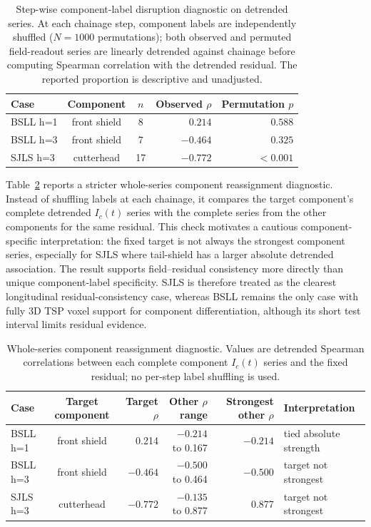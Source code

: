 \begin{table}[htbp]
\centering
\caption{Step-wise component-label disruption diagnostic on detrended series.
At each chainage step, component labels are independently shuffled ($N=1000$
permutations); both observed and permuted field-readout series are linearly
detrended against chainage before computing Spearman correlation with the
detrended residual. The reported proportion is descriptive and unadjusted.}
\label{tab:component_permutation}
\scriptsize
\setlength{\tabcolsep}{6pt}
\begin{tabular}{lccrr}
\toprule
Case & Component & $n$ & Observed $\rho$ & Permutation $p$ \\
\midrule
BSLL h=1 & front shield & 8 & $0.214$ & $0.588$ \\
BSLL h=3 & front shield & 7 & $-0.464$ & $0.325$ \\
SJLS h=3 & cutterhead & 17 & $-0.772$ & $<0.001$ \\
\bottomrule
\end{tabular}
\end{table}

Table~\ref{tab:component_series_reassignment} reports a stricter whole-series
component reassignment diagnostic. Instead of shuffling labels at each
chainage, it compares the target component's complete detrended $I_c(t)$ series
with the complete series from the other components for the same residual. This
check motivates a cautious component-specific interpretation:
the fixed target is not always the strongest component series, especially for
SJLS where tail-shield has a larger absolute detrended association. The result
supports field--residual consistency more directly than unique
component-label specificity.
SJLS is therefore treated as the clearest longitudinal residual-consistency
case, whereas BSLL remains the only case with fully 3D TSP voxel support for
component differentiation, although its short test interval limits residual
evidence.

\begin{table}[htbp]
\centering
\caption{Whole-series component reassignment diagnostic. Values are detrended
Spearman correlations between each complete component $I_c(t)$ series and the
fixed residual; no per-step label shuffling is used.}
\label{tab:component_series_reassignment}
\scriptsize
\setlength{\tabcolsep}{4pt}
\begin{tabular}{lcrrrl}
\toprule
Case & Target component & Target $\rho$ & Other $\rho$ range & Strongest other $\rho$ & Interpretation \\
\midrule
BSLL h=1 & front shield & 0.214 & $-0.214$ to 0.167 & $-0.214$ & tied absolute strength \\
BSLL h=3 & front shield & $-0.464$ & $-0.500$ to 0.464 & $-0.500$ & target not strongest \\
SJLS h=3 & cutterhead & $-0.772$ & $-0.135$ to 0.877 & 0.877 & target not strongest \\
\bottomrule
\end{tabular}
\end{table}


